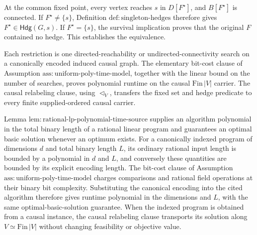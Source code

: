 At the common fixed point, every vertex reaches \(s\) in
\(D[F^{\star}]\), and \(B[F^{\star}]\) is connected.  If
\(F^{\star}\neq\{s\}\), Definition
\(\mathrm{def{:}singleton\mbox{-}hedges}\) therefore gives
\(F^{\star}\in\mathsf{Hdg}(G,s)\).  If
\(F^{\star}=\{s\}\), the survival implication proves that the original
\(F\) contained no hedge.  This establishes the equivalence.

Each restriction is one directed-reachability or undirected-connectivity
search on a canonically encoded induced causal graph.  The elementary
bit-cost clause of Assumption
\(\mathrm{ass{:}uniform\mbox{-}poly\mbox{-}time\mbox{-}model}\), together
with the linear bound on the number of searches, proves polynomial runtime
on the causal \(\mathrm{Fin}\,|V|\) carrier.  The causal relabeling clause,
using \(\triangleleft_V\), transfers the fixed set and hedge predicate to
every finite supplied-ordered causal carrier.

Lemma
\(\mathrm{lem{:}rational\mbox{-}lp\mbox{-}polynomial\mbox{-}time\mbox{-}source}\)
supplies an algorithm polynomial in the total binary length of a rational
linear program and guarantees an optimal basic solution whenever an optimum
exists.  For a canonically indexed program of dimensions \(d\) and total
binary length \(L\), its ordinary rational input length is bounded by a
polynomial in \(d\) and \(L\), and conversely these quantities are bounded
by its explicit encoding length.  The bit-cost clause of Assumption
\(\mathrm{ass{:}uniform\mbox{-}poly\mbox{-}time\mbox{-}model}\) charges
comparisons and rational field operations at their binary bit complexity.
Substituting the canonical encoding into the cited algorithm therefore gives
runtime polynomial in the dimensions and \(L\), with the same
optimal-basic-solution guarantee.  When the indexed program is obtained from
a causal instance, the causal relabeling clause transports its solution
along \(V\simeq\mathrm{Fin}\,|V|\) without changing feasibility or objective
value.

